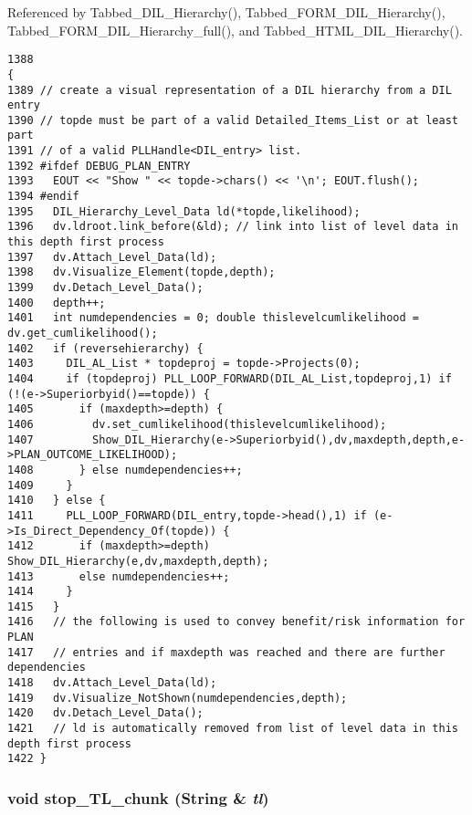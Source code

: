 Referenced by Tabbed\_\-DIL\_\-Hierarchy(), Tabbed\_\-FORM\_\-DIL\_\-Hierarchy(), Tabbed\_\-FORM\_\-DIL\_\-Hierarchy\_\-full(), and Tabbed\_\-HTML\_\-DIL\_\-Hierarchy().



\footnotesize\begin{verbatim}1388                                                                                                                                                {
1389 // create a visual representation of a DIL hierarchy from a DIL entry
1390 // topde must be part of a valid Detailed_Items_List or at least part
1391 // of a valid PLLHandle<DIL_entry> list.
1392 #ifdef DEBUG_PLAN_ENTRY
1393   EOUT << "Show " << topde->chars() << '\n'; EOUT.flush();
1394 #endif
1395   DIL_Hierarchy_Level_Data ld(*topde,likelihood);
1396   dv.ldroot.link_before(&ld); // link into list of level data in this depth first process
1397   dv.Attach_Level_Data(ld);
1398   dv.Visualize_Element(topde,depth);
1399   dv.Detach_Level_Data();
1400   depth++;
1401   int numdependencies = 0; double thislevelcumlikelihood = dv.get_cumlikelihood();
1402   if (reversehierarchy) {
1403     DIL_AL_List * topdeproj = topde->Projects(0);
1404     if (topdeproj) PLL_LOOP_FORWARD(DIL_AL_List,topdeproj,1) if (!(e->Superiorbyid()==topde)) {
1405       if (maxdepth>=depth) {
1406         dv.set_cumlikelihood(thislevelcumlikelihood);
1407         Show_DIL_Hierarchy(e->Superiorbyid(),dv,maxdepth,depth,e->PLAN_OUTCOME_LIKELIHOOD);
1408       } else numdependencies++;
1409     }
1410   } else {
1411     PLL_LOOP_FORWARD(DIL_entry,topde->head(),1) if (e->Is_Direct_Dependency_Of(topde)) {
1412       if (maxdepth>=depth) Show_DIL_Hierarchy(e,dv,maxdepth,depth);
1413       else numdependencies++;
1414     }
1415   }
1416   // the following is used to convey benefit/risk information for PLAN
1417   // entries and if maxdepth was reached and there are further dependencies
1418   dv.Attach_Level_Data(ld);
1419   dv.Visualize_NotShown(numdependencies,depth);
1420   dv.Detach_Level_Data();
1421   // ld is automatically removed from list of level data in this depth first process
1422 }
\end{verbatim}\normalsize 
{}
\subsubsection{\setlength{\rightskip}{0pt plus 5cm}void stop\_\-TL\_\-chunk ({\bf String} \& {\em tl})}\label{dil2al_8hh_a322}




